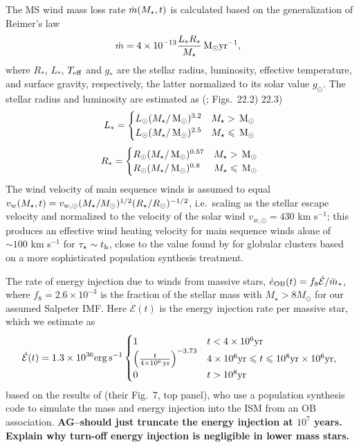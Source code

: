 The MS wind mass loss rate $\dot{m}(M_{\star}, t)$ is calculated based on
the generalization of Reimer's law
\begin{align}
  \dot{m}=4 \times 10^{-13} \frac{L_* R_*}{M_{\star}} \,{\rm M_\odot} {\rm yr}^{-1},\
\end{align}
where  $R_*$, $L_*$, $T_{\rm eff}$ and $g_*$ are the stellar radius,
luminosity, effective temperature, and surface gravity, respectively, the latter normalized to its solar value $g_{\odot}$.  The stellar radius and luminosity are estimated as (\citet{Kippenhahn&Weigert90}; Figs.~22.2) 22.3)
\begin{align}
L_*=
\begin{cases}
L_{\odot} (M_{\star}/\,{\rm M_\odot})^{3.2} & M_{\star} > \,{\rm M_\odot} \\
L_{\odot} (M_{\star}/\,{\rm M_\odot})^{2.5} & M_{\star} \leqslant \,{\rm M_\odot}
\end{cases}
\end{align}
\begin{align}
R_*=
\begin{cases}
R_{\odot} (M_{\star}/\,{\rm M_\odot})^{0.57} & M_{\star} > \,{\rm M_\odot} \\
R_{\odot} (M_{\star}/\,{\rm M_\odot})^{0.8} & M_{\star} \leqslant \,{\rm M_\odot}
\end{cases}
\end{align}
The wind velocity of main sequence winds is assumed to equal $v_w
(M_{\star}, t) =
v_{w,\odot}(M_{\star}/M_{\odot})^{1/2}(R_{\star}/R_{\odot})^{-1/2}$,
i.e.~scaling as the stellar escape velocity and normalized to the
velocity of the solar wind $v_{w,\odot} = 430$ km s$^{-1}$; this
produces an effective wind heating velocity for main sequence winds
alone of $\sim 100$ km s$^{-1}$ for $\tau_{\star} \sim t_{\rm h}$,
close to the value found by \citet{NaimanSoares-Furtado+:2013a} for
globular clusters based on a more sophisticated population synthesis
treatment.

The rate of energy injection due to winds from massive
stars, $\dot{e}_{\rm OB}(t) = f_{8}\dot{\mathcal{E}}/\bar{m}_*$, where
$f_{8} =2.6 \times 10^{-3}$ is the fraction of the stellar mass with
$M_{\star} > 8M_{\odot}$ for our assumed Salpeter IMF.  Here
$\dot{\mathcal{E}} (t)$ is the energy injection rate per massive star,
which we estimate as
\begin{align}
\dot{\mathcal{E}} (t)=  1.3 \times 10^{36} {\rm erg\,s^{-1}}
\begin{cases}
  1 & t<4 \times 10^6 {\rm yr}\\
  \left(\frac{t}{4 \times  10^6\,{\rm yr}}\right)^{-3.73} &  4\times
  10^{6} {\rm yr}  \le t \le 10^{8} {\rm yr}
  \times 10^6 {\rm yr},\\
  0 & t > 10^8 {\rm yr}
\end{cases}
\label{eq:voss}
\end{align}
based on the results of \citet{VossDiehl+:2009a} (their Fig.~7, top
panel), who use a population synthesis code to simulate the mass and
energy injection into the ISM from an OB association. {\bf AG--should
  just truncate the energy injection at $10^7$ years. Explain why
  turn-off energy injection is negligible in lower mass stars.}


